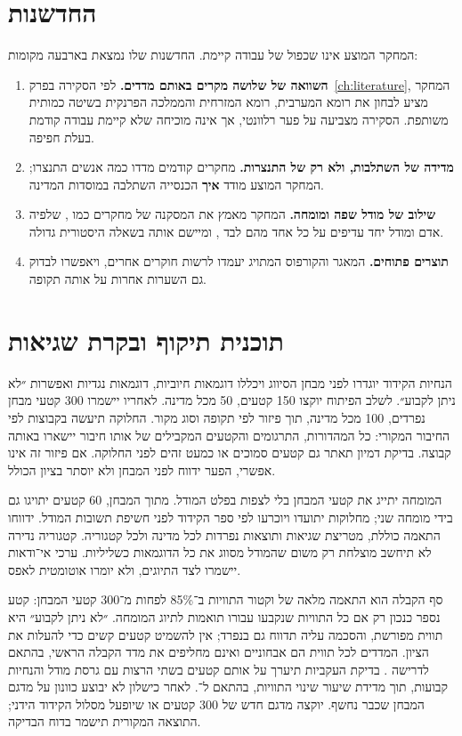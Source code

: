 \section{החדשנות}
\label{sec:alt-innovation}

המחקר המוצע אינו שכפול של עבודה קיימת. החדשנות שלו נמצאת בארבעה מקומות:

\begin{enumerate}
  \item \textbf{השוואה של שלושה מקרים באותם מדדים.} לפי הסקירה בפרק~\ref{ch:literature}, המחקר מציע לבחון את רומא המערבית, רומא המזרחית והממלכה הפרנקית בשיטה כמותית משותפת. הסקירה מצביעה על פער רלוונטי, אך אינה מוכיחה שלא קיימת עבודה קודמת בעלת חפיפה.
  \item \textbf{מדידה של השתלבות, ולא רק של התנצרות.} מחקרים קודמים מדדו כמה אנשים התנצרו; המחקר המוצע מודד \textbf{איך} הכנסייה השתלבה במוסדות המדינה.
  \item \textbf{שילוב של מודל שפה ומומחה.} המחקר מאמץ את המסקנה של מחקרים כמו , שלפיה אדם ומודל יחד עדיפים על כל אחד מהם לבד \cite{assael2022ithaca}, ומיישם אותה בשאלה היסטורית גדולה.
  \item \textbf{תוצרים פתוחים.} המאגר והקורפוס המתויג יעמדו לרשות חוקרים אחרים, ויאפשרו לבדוק גם השערות אחרות על אותה תקופה.
\end{enumerate}


\section{תוכנית תיקוף ובקרת שגיאות}
\label{sec:alt-validation}

הנחיות הקידוד יוגדרו לפני מבחן הסיווג ויכללו דוגמאות חיוביות, דוגמאות נגדיות ואפשרות ״לא ניתן לקבוע״. לשלב הפיתוח יוקצו 150 קטעים, 50 מכל מדינה. לאחריו יישמרו 300 קטעי מבחן נפרדים, 100 מכל מדינה, תוך פיזור לפי תקופה וסוג מקור. החלוקה תיעשה בקבוצות לפי החיבור המקורי: כל המהדורות, התרגומים והקטעים המקבילים של אותו חיבור יישארו באותה קבוצה. בדיקת דמיון תאתר גם קטעים סמוכים או כמעט זהים לפני החלוקה. אם פיזור זה אינו אפשרי, הפער ידווח לפני המבחן ולא יוסתר בציון הכולל.

המומחה יתייג את קטעי המבחן בלי לצפות בפלט המודל. מתוך המבחן, 60 קטעים יתויגו גם בידי מומחה שני; מחלוקות יתועדו ויוכרעו לפי ספר הקידוד לפני חשיפת תשובות המודל. ידווחו התאמה כוללת, מטריצת שגיאות ותוצאות נפרדות לכל מדינה ולכל קטגוריה. קטגוריה נדירה לא תיחשב מוצלחת רק משום שהמודל מסווג את כל הדוגמאות כשליליות. ערכי אי־ודאות יישמרו לצד התיוגים, ולא יומרו אוטומטית לאפס.

סף הקבלה הוא התאמה מלאה של וקטור התוויות ב־85\% לפחות מ־300 קטעי המבחן: קטע נספר כנכון רק אם כל התוויות שנקבעו עבורו תואמות לתיוג המומחה. ״לא ניתן לקבוע״ היא תווית מפורשת, והסכמה עליה תדווח גם בנפרד; אין להשמיט קטעים קשים כדי להעלות את הציון. המדדים לכל תווית הם אבחוניים ואינם מחליפים את מדד הקבלה הראשי, בהתאם לדרישה . בדיקת העקביות תיערך על אותם קטעים בשתי הרצות עם גרסת מודל והנחיות קבועות, תוך מדידת שיעור שינוי התוויות, בהתאם ל־. לאחר כישלון לא יבוצע כוונון על מדגם המבחן שכבר נחשף. יוקצה מדגם חדש של 300 קטעים או שיופעל מסלול הקידוד הידני; התוצאה המקורית תישמר בדוח הבדיקה.


